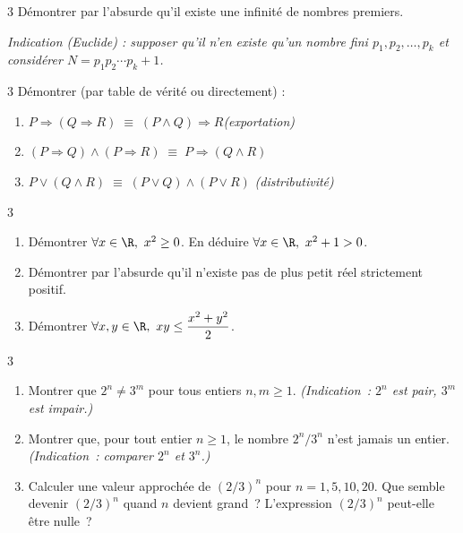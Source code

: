 \begin{exo}{3}
D\'emontrer par l'absurde qu'il existe une infinit\'e de nombres premiers.

\emph{Indication (Euclide) : supposer qu'il n'en existe qu'un nombre fini
$p_1, p_2, \ldots, p_k$ et consid\'erer $N = p_1 p_2 \cdots p_k + 1$.}
\end{exo}

\begin{exo}{3}
D\'emontrer (par table de v\'erit\'e ou directement) :
\begin{enumerate}
  \item $P \Rightarrow (Q \Rightarrow R)
        \;\equiv\; (P \land Q) \Rightarrow R$\quad\emph{(exportation)}
  \item $(P \Rightarrow Q) \land (P \Rightarrow R)
        \;\equiv\; P \Rightarrow (Q \land R)$
  \item $P \lor (Q \land R)
        \;\equiv\; (P \lor Q) \land (P \lor R)$
        \quad\emph{(distributivit\'e)}
\end{enumerate}
\end{exo}

\begin{exo}{3}
\begin{enumerate}
  \item D\'emontrer $\forall x \in \R,\ x^2 \geq 0$.
        En d\'eduire $\forall x \in \R,\ x^2 + 1 > 0$.
  \item D\'emontrer par l'absurde qu'il n'existe pas de plus petit
        r\'eel strictement positif.
  \item D\'emontrer $\forall x, y \in \R,\ xy \leq \dfrac{x^2+y^2}{2}$.
\end{enumerate}
\end{exo}

\begin{exo}{3}
\begin{enumerate}
  \item Montrer que $2^n \ne 3^m$ pour tous entiers $n, m \geq 1$.
        \emph{(Indication~: $2^n$ est pair, $3^m$ est impair.)}
  \item Montrer que, pour tout entier $n\geq1$, le nombre $2^n/3^n$
        n'est jamais un entier.
        \emph{(Indication~: comparer $2^n$ et $3^n$.)}
  \item Calculer une valeur approch\'ee de $(2/3)^n$ pour $n = 1, 5, 10, 20$.
        Que semble devenir $(2/3)^n$ quand $n$ devient grand~?
        L'expression $(2/3)^n$ peut-elle \^etre nulle~?
\end{enumerate}
\end{exo}

